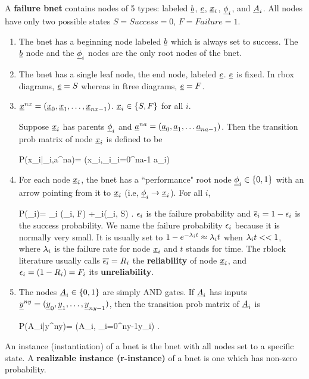 A {\bf failure bnet} contains
nodes of 5  types:
labeled ${\underline{b}}$, ${\underline{e}}$, ${\underline{x}}_i$,
$\underline{\phi}_i$, and ${\underline{A}}_i$.
All nodes have only
two possible states
$S=Success=0$, $F=Failure=1$.
\begin{enumerate}
\item 
The bnet has a beginning node labeled
${\underline{b}}$ which is always set to success.
The ${\underline{b}}$ node
and the $\underline{\phi}_i$
nodes are the only root nodes of
the bnet.

\item The bnet has 
a single leaf node, the end node, labeled 
${\underline{e}}$. ${\underline{e}}$ is fixed.
In rbox diagrams,
${\underline{e}}=S$
whereas in ftree diagrams, ${\underline{e}}=F$.

\item
${\underline{x}}^{nx}=
({\underline{x}}_0, {\underline{x}}_1, \ldots, {\underline{x}}_{nx-1})$.
${\underline{x}}_i\in \{S, F\}$ for all $i$.

Suppose ${\underline{x}}_i$
has parents 
$\underline{\phi}_i$ and ${\underline{a}}^{na}=({\underline{a}}_0, {\underline{a}}_1,
\dots {\underline{a}}_{na-1})$.
Then the transition prob
matrix of node ${\underline{x}}_i$ is
defined to be

 
\beq\color{blue}
P(x_i|\phi_i,a^{na})=
\delta(x_i,\phi_i\V  \V_{i=0}^{na-1} a_i)
\eeq

\item
For each node ${\underline{x}}_i$, the bnet has
 a ``performance"
 root node $\underline{\phi}_i\in \{0,1\}$
with an arrow
pointing from it 
to ${\underline{x}}_i$ (i.e, 
$\underline{\phi}_i\rightarrow {\underline{x}}_i$).
For all $i$,

\beq \color{blue}
P(\phi_i)=
\eps_i \delta(\phi_i, F)
+\ol{\eps}_i\delta(\phi_i, S)
\;.
\eeq
$\epsilon_i$ is the failure probability
and $\overline{\epsilon}_i=1-\epsilon_i$
is the success probability.
We name the failure
probability $\epsilon_i$
because it
is normally very small.
It is usually
set to
$1-e^{-\lambda_it}\approx \lambda_it$
when $\lambda_it<<1$,
where $\lambda_i$
is the failure rate
for node ${\underline{x}}_i$
and $t$ stands for time.
The rblock
literature
usually calls 
$\overline{\epsilon_i}=R_i$
the {\bf reliability}
 of 
node ${\underline{x}}_i$,
and 
$\epsilon_i=(1-R_i)=F_i$
its {\bf unreliability}.


\item
The nodes ${\underline{A}}_i\in \{0,1\}$ 
are simply AND gates.
If ${\underline{A}}_i$ has inputs ${\underline{y}}^{ny}=
({\underline{y}}_0, {\underline{y}}_1,
\ldots, {\underline{y}}_{ny-1})$,
then the transition
prob matrix of ${\underline{A}}_i$ is

\beq\color{blue}
P(A_i|y^{ny})=
\delta(A_i, \A_{i=0}^{ny-1}y_i)
\;.
\eeq

\end{enumerate}

An instance (instantiation)
of a bnet is the bnet 
with all nodes set to
a specific state.
A {\bf realizable instance (r-instance)}
of a bnet is one
which has non-zero probability.


